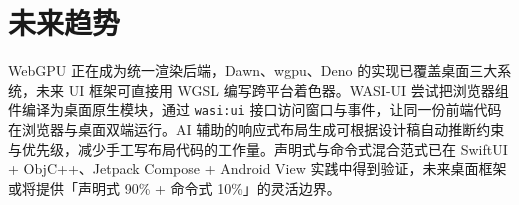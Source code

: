 \chapter{未来趋势}
WebGPU 正在成为统一渲染后端，Dawn、wgpu、Deno 的实现已覆盖桌面三大系统，未来 UI 框架可直接用 WGSL 编写跨平台着色器。WASI-UI 尝试把浏览器组件编译为桌面原生模块，通过 \texttt{wasi:ui} 接口访问窗口与事件，让同一份前端代码在浏览器与桌面双端运行。AI 辅助的响应式布局生成可根据设计稿自动推断约束与优先级，减少手工写布局代码的工作量。声明式与命令式混合范式已在 SwiftUI + ObjC++、Jetpack Compose + Android View 实践中得到验证，未来桌面框架或将提供「声明式 90\%{} + 命令式 10\%{}」的灵活边界。\par
